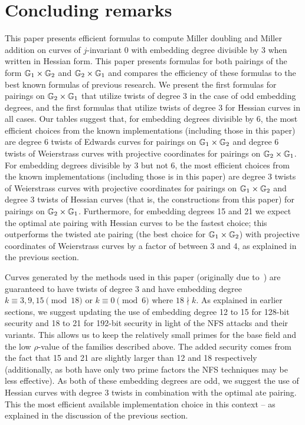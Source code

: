 \section{Concluding remarks}
\label{sec:conclude}

This paper presents efficient formulas to compute Miller doubling and Miller addition on curves of $j$-invariant 0 with embedding degree divisible by 3 when written in Hessian form.
This paper presents formulas for both pairings of the form $\mathbb{G}_{1} \times \mathbb{G}_{2}$ and $\mathbb{G}_{2} \times \mathbb{G}_{1}$ and compares the efficiency of these formulas to the best known formulas of previous research.
We present the first formulas for pairings on $\mathbb{G}_{2} \times \mathbb{G}_{1}$ that utilize twists of degree 3 in the case of odd embedding degrees, and the first formulas that utilize twists of degree 3 for Hessian curves in all cases. Our tables suggest that, for embedding degrees divisible by 6, the most efficient choices from the known implementations (including those in this paper) are degree 6 twists of Edwards curves for pairings on $\mathbb{G}_{1} \times \mathbb{G}_{2}$ and degree 6 twists of Weierstrass curves with projective coordinates for pairings on $\mathbb{G}_{2} \times \mathbb{G}_{1}$.
For embedding degrees divisible by 3 but not 6, the most efficient choices from the 
known implementations (including those is in this paper) are degree 3 twists of Weierstrass curves with projective coordinates for pairings on $\mathbb{G}_{1} \times \mathbb{G}_{2}$ 
and degree 3 twists of Hessian curves (that is, the constructions from this paper) for pairings on $\mathbb{G}_{2} \times \mathbb{G}_{1}$. 
Furthermore, for embedding degrees 15 and 21 we expect the optimal ate pairing with Hessian curves to be the fastest choice; this outperforms
the twisted ate pairing (the best choice for $\mathbb{G}_{1} \times \mathbb{G}_{2}$) with projective coordinates of Weierstrass curves by a factor of between 3 and 4, as explained in the previous section.

Curves generated by the methods used in this paper (originally due to~\cite{2010/freeman}) are guaranteed to have twists of degree $3$
and have embedding degree
$k \equiv 3,9,15 \pmod{18}$ or
$k \equiv 0 \pmod{6}$ where $18 \nmid k$.
As explained in earlier sections, we suggest updating the use of embedding degree 12 to 15 for 128-bit security and 18 to 21 for 192-bit security in light of the NFS attacks and their variants. This allows us to keep the relatively small primes for the base field and the low $\rho$-value of the families described above. 
The added security comes from the fact that 15 and 21 are slightly
larger than 12 and 18 respectively (additionally, as both have only two prime factors the NFS techniques may be less effective).
As both of these embedding degrees are odd, we suggest the use of Hessian curves with degree 3 twists in combination with the optimal ate pairing. 
This the most efficient available implementation choice in this context -- as explained in the discussion of the previous section.


